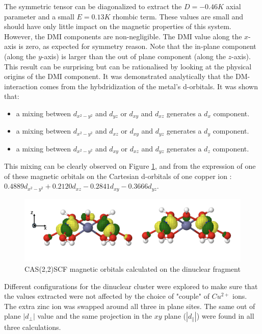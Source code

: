 \documentclass[12pt]{report}
\numberwithin{equation}{section}
\begin{document}
The symmetric tensor can be diagonalized to extract the $ D = - 0.46 K $ axial parameter and a small $ E = 0.13 K$ rhombic term. These values are small and should have only little impact on the magnetic properties of this system.
However, the DMI components are non-negligible. 
The DMI value along the $x$-axis is zero, as expected for symmetry reason. 
Note that the in-plane component (along the $y$-axis) is larger than the out of plane component (along the $z$-axis). 
This result can be surprising but can be rationalised by looking at the physical origins of the DMI component.
It was demonstrated analytically that the DM-interaction comes from the hybdridization of the metal's d-orbitals. 
It was shown that:
\begin{itemize}
    \item a mixing between $ d_{x^2-y^2}$ and $ d_{yz}$ or $ d_{xy}$ and $d_{xz}$ generates a $ d_{x}$ component.
    \item a mixing between $d_{x^2-y^2}$ and $ d_{xz}$ or $ d_{xy}$ and $d_{yz}$ generates a $ d_{y}$ component.
    \item a mixing between $ d_{x^2-y^2}$ and $d_{xy}$ or $ d_{xz}$ and $d_{yz}$ generates a $ d_{z}$ component.
\end{itemize}

This mixing can be clearly observed on Figure \ref{CAS22}, and from the expression of one of these magnetic orbitals on the Cartesian
d-orbitals of one copper ion : $0.4889d_{x^2-y^2}+0.2120d_{xz}-0.2841d_{xy}-0.3666d_{yz}$.

\begin{figure}[!ht]
    \centering
    \includegraphics[width=\textwidth]{Images/CAS22.png}
    \caption{CAS(2,2)SCF magnetic orbitals calculated on the dinuclear fragment}
    \label{CAS22}
\end{figure}


Different configurations for the dinuclear cluster were explored to make sure that the values extracted were not affected by the choice of "couple" of $Cu^{2+}$ ions. 
The extra zinc ion was swapped around all three in plane sites. 
The same out of plane $|d_{\perp}|$ value and the same projection in the $xy$ plane ($|d_{\parallel}|$) were found in all three calculations.
\end{document}
